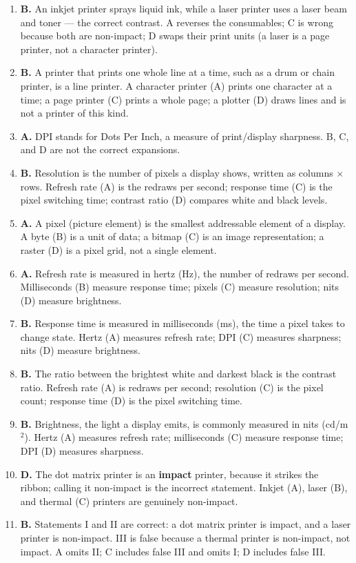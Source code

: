 \begin{enumerate}[label=\textbf{Q\arabic*.}, leftmargin=*]
\item \textbf{B.} An inkjet printer sprays liquid ink, while a laser printer
  uses a laser beam and toner --- the correct contrast. A reverses the
  consumables; C is wrong because both are non-impact; D swaps their print
  units (a laser is a page printer, not a character printer).
\item \textbf{B.} A printer that prints one whole line at a time, such as a
  drum or chain printer, is a line printer. A character printer (A) prints one
  character at a time; a page printer (C) prints a whole page; a plotter (D)
  draws lines and is not a printer of this kind.
\item \textbf{A.} DPI stands for Dots Per Inch, a measure of print/display
  sharpness. B, C, and D are not the correct expansions.
\item \textbf{B.} Resolution is the number of pixels a display shows,
  written as columns $\times$ rows. Refresh rate (A) is the redraws per
  second; response time (C) is the pixel switching time; contrast ratio (D)
  compares white and black levels.
\item \textbf{A.} A pixel (picture element) is the smallest addressable
  element of a display. A byte (B) is a unit of data; a bitmap (C) is an
  image representation; a raster (D) is a pixel grid, not a single element.
\item \textbf{A.} Refresh rate is measured in hertz (Hz), the number of
  redraws per second. Milliseconds (B) measure response time; pixels (C)
  measure resolution; nits (D) measure brightness.
\item \textbf{B.} Response time is measured in milliseconds (ms), the time a
  pixel takes to change state. Hertz (A) measures refresh rate; DPI (C)
  measures sharpness; nits (D) measure brightness.
\item \textbf{B.} The ratio between the brightest white and darkest black is
  the contrast ratio. Refresh rate (A) is redraws per second; resolution (C)
  is the pixel count; response time (D) is the pixel switching time.
\item \textbf{B.} Brightness, the light a display emits, is commonly measured
  in nits (cd/m$^2$). Hertz (A) measures refresh rate; milliseconds (C)
  measure response time; DPI (D) measures sharpness.
\item \textbf{D.} The dot matrix printer is an \textbf{impact} printer,
  because it strikes the ribbon; calling it non-impact is the incorrect
  statement. Inkjet (A), laser (B), and thermal (C) printers are genuinely
  non-impact.
\item \textbf{B.} Statements I and II are correct: a dot matrix printer is
  impact, and a laser printer is non-impact. III is false because a thermal
  printer is non-impact, not impact. A omits II; C includes false III and
  omits I; D includes false III.


\end{enumerate}
